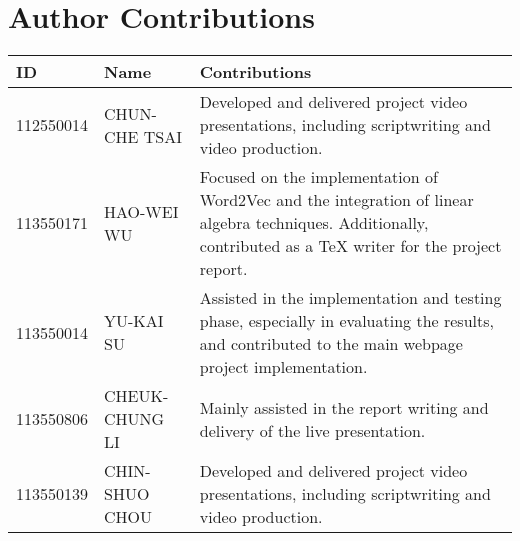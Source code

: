 \section{Author Contributions}

\begin{table}[H]
    \centering
    \begin{tabularx}{\textwidth}{p{1.7cm}p{3.5cm}X} %
        \hline
        \textbf{ID} & \textbf{Name} & \textbf{Contributions} \\ 
        \hline
        112550014 & CHUN-CHE TSAI & Developed and delivered project video presentations, including scriptwriting and video production. \\
        \hline
        113550171 & HAO-WEI WU & Focused on the implementation of Word2Vec and the integration of linear algebra techniques. Additionally, contributed as a TeX writer for the project report.\\
        \hline
        113550014 & YU-KAI SU & Assisted in the implementation and testing phase, especially in evaluating the results, and contributed to the main webpage project implementation. \\
        \hline
        113550806 & CHEUK-CHUNG LI & Mainly assisted in the report writing and delivery of the live presentation. \\
        \hline
        113550139 & CHIN-SHUO CHOU & Developed and delivered project video presentations, including scriptwriting and video production. \\
        \hline
    \end{tabularx}
\end{table}